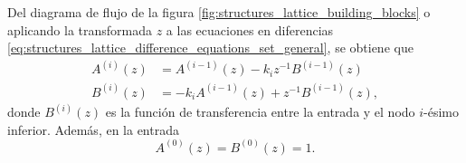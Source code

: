 \documentclass[a4paper]{report}
\begin{document}
Del diagrama de flujo de la figura \ref{fig:structures_lattice_building_blocks} o aplicando la transformada \(z\) a las ecuaciones en diferencias \ref{eq:structures_lattice_difference_equations_set_general}, se obtiene que 
\begin{align}
 A^{(i)}(z)&=A^{(i-1)}(z)-k_iz^{-1}B^{(i-1)}(z)
 \label{eq:structures_lattice_difference_equations_z_transform_Ai}\\
 B^{(i)}(z)&=-k_iA^{(i-1)}(z)+z^{-1}B^{(i-1)}(z)
 \label{eq:structures_lattice_difference_equations_z_transform_Bi},
\end{align}
donde \(B^{(i)}(z)\) es la función de transferencia entre la entrada y el nodo \(i\)-ésimo inferior. Además, en la entrada
\begin{equation}\label{eq:structures_lattice_difference_equations_z_transform_A0B0}
 A^{(0)}(z)=B^{(0)}(z)=1.
\end{equation}
\end{document}

